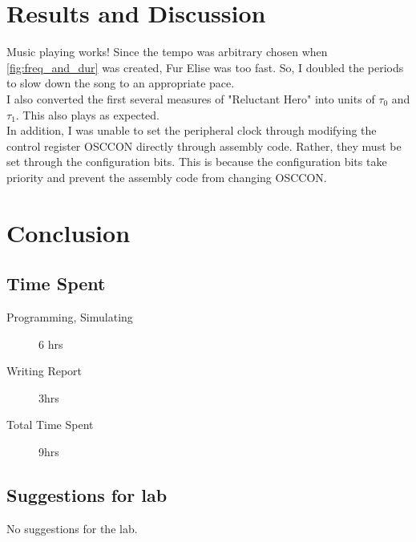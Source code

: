 \documentclass[11pt]{article}
\begin{document}
\clearpage

\section{Results and Discussion}

Music playing works! Since the tempo was arbitrary chosen when \ref{fig:freq_and_dur} was created, Fur Elise was too fast. So, I doubled the periods to slow down the song to an appropriate pace. \\

I also converted the first several measures of "Reluctant Hero" into units of $\tau_{0}$ and $\tau_{1}$. This also plays as expected. \\

In addition, I was unable to set the peripheral clock through modifying the control register OSCCON directly through assembly code. Rather, they must be set through the configuration bits. This is because the configuration bits take priority and prevent the assembly code from changing OSCCON.


\section{Conclusion}

\subsection{Time Spent}

\begin{description}
	\item[Programming, Simulating] 6 hrs
 	\item[Writing Report] 3hrs
	\item[Total Time Spent] 9hrs
\end{description}

\subsection{Suggestions for lab}

No suggestions for the lab.
\end{document}
